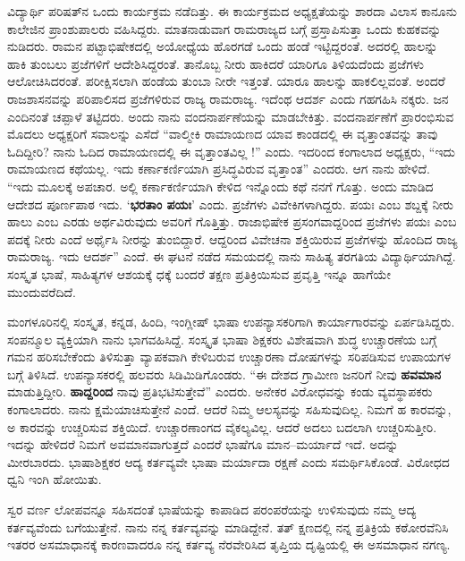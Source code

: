 ವಿದ್ಯಾರ್ಥಿ ಪರಿಷತ್‍ನ ಒಂದು ಕಾರ್ಯಕ್ರಮ ನಡೆದಿತ್ತು.  ಈ ಕಾರ್ಯಕ್ರಮದ ಅಧ್ಯಕ್ಷತೆಯನ್ನು ಶಾರದಾ ವಿಲಾಸ ಕಾನೂನು ಕಾಲೇಜಿನ ಪ್ರಾಂಶುಪಾಲರು ವಹಿಸಿದ್ದರು.  ಮಾತನಾಡುವಾಗ ರಾಮರಾಜ್ಯದ ಬಗ್ಗೆ ಪ್ರಸ್ತಾಪಿಸುತ್ತಾ ಒಂದು ಕುಹಕವನ್ನು ನುಡಿದರು.  ರಾಮನ ಪಟ್ಟಾಭಿಷೇಕದಲ್ಲಿ ಅಯೋಧ್ಯೆಯ ಹೊರಗಡೆ ಒಂದು ಹಂಡೆ ಇಟ್ಟಿದ್ದರಂತೆ.  ಅದರಲ್ಲಿ ಹಾಲನ್ನು ಹಾಕಿ ತುಂಬಲು ಪ್ರಜೆಗಳಿಗೆ ಆದೇಶಿಸಿದ್ದರಂತೆ.  ತಾನೊಬ್ಬ ನೀರು ಹಾಕಿದರೆ ಯಾರಿಗೂ ತಿಳಿಯದೆಂದು ಪ್ರಜೆಗಳು ಆಲೋಚಿಸಿದರಂತೆ. ಪರೀಕ್ಷಿಸಲಾಗಿ ಹಂಡೆಯ ತುಂಬಾ ನೀರೇ ಇತ್ತಂತೆ.  ಯಾರೂ ಹಾಲನ್ನು ಹಾಕಲಿಲ್ಲವಂತೆ.  ಅಂದರೆ ರಾಜಶಾಸನವನ್ನು ಪರಿಪಾಲಿಸದ ಪ್ರಜೆಗಳಿರುವ ರಾಜ್ಯ ರಾಮರಾಜ್ಯ.  ಇದೆಂಥ ಆದರ್ಶ ಎಂದು ಗಹಗಹಿಸಿ ನಕ್ಕರು.  ಜನ ಎಂದಿನಂತೆ ಚಪ್ಪಾಳೆ ತಟ್ಟಿದರು.  ಅಂದು ನಾನು ವಂದನಾರ್ಪಣೆಯನ್ನು ಮಾಡಬೇಕಿತ್ತು.  ವಂದನಾರ್ಪಣೆಗೆ ಪ್ರಾರಂಭಿಸುವ ಮೊದಲು ಅಧ್ಯಕ್ಷರಿಗೆ ಸವಾಲನ್ನು ಎಸೆದೆ  “ವಾಲ್ಮೀಕಿ ರಾಮಾಯಣದ ಯಾವ ಕಾಂಡದಲ್ಲಿ ಈ ವೃತ್ತಾಂತವನ್ನು ತಾವು ಓದಿದ್ದೀರಿ?  ನಾನು ಓದಿದ ರಾಮಾಯಣದಲ್ಲಿ ಈ ವೃತ್ತಾಂತವಿಲ್ಲ !” ಎಂದು.  ಇದರಿಂದ ಕಂಗಾಲಾದ ಅಧ್ಯಕ್ಷರು, “ಇದು ರಾಮಾಯಣದ ಕಥೆಯಲ್ಲ. ಇದು ಕರ್ಣಾಕರ್ಣಿಯಾಗಿ ಪ್ರಸಿದ್ಧವಿರುವ ವೃತ್ತಾಂತ” ಎಂದರು.  ಆಗ ನಾನು ಹೇಳಿದೆ.  “ಇದು ಮೂಲಕ್ಕೆ ಅಪಚಾರ.  ಅಲ್ಲಿ ಕರ್ಣಾಕರ್ಣಿಯಾಗಿ ಕೇಳಿದ ಇನ್ನೊಂದು ಕಥೆ ನನಗೆ ಗೊತ್ತು. ಅಂದು ಮಾಡಿದ ಆದೇಶದ ಪೂರ್ಣಪಾಠ ಇದು.  ‘\textbf{ಭರತಾಂ ಪಯಃ}’ ಎಂದು.  ಪ್ರಜೆಗಳು ವಿವೇಕಿಗಳಾಗಿದ್ದರು.  ಪಯಃ ಎಂಬ ಶಬ್ದಕ್ಕೆ ನೀರು ಹಾಲು ಎಂಬ ಎರಡು ಅರ್ಥವಿರುವುದು ಅವರಿಗೆ ಗೊತ್ತಿತ್ತು.  ರಾಜಾಭಿಷೇಕ ಪ್ರಸಂಗವಾದ್ದರಿಂದ ಪ್ರಜೆಗಳು ಪಯಃ ಎಂಬ ಪದಕ್ಕೆ ನೀರು ಎಂದೆ ಅರ್ಥೈಸಿ ನೀರನ್ನು ತುಂಬಿದ್ದಾರೆ. ಆದ್ದರಿಂದ ವಿವೇಚನಾ ಶಕ್ತಿಯಿರುವ ಪ್ರಜೆಗಳನ್ನು ಹೊಂದಿದ ರಾಜ್ಯ ರಾಮರಾಜ್ಯ.  ಇದು ಆದರ್ಶ” ಎಂದೆ.  ಈ ಘಟನೆ ನಡೆದ ಸಮಯದಲ್ಲಿ ನಾನು ಸಾಹಿತ್ಯ ತರಗತಿಯ ವಿದ್ಯಾರ್ಥಿಯಾಗಿದ್ದೆ.  ಸಂಸ್ಕೃತ ಭಾಷೆ, ಸಾಹಿತ್ಯಗಳ ಆಶಯಕ್ಕೆ ಧಕ್ಕೆ ಬಂದರೆ ತಕ್ಷಣ ಪ್ರತಿಕ್ರಿಯಿಸುವ ಪ್ರವೃತ್ತಿ ಇನ್ನೂ ಹಾಗೆಯೇ ಮುಂದುವರೆದಿದೆ.   

ಮಂಗಳೂರಿನಲ್ಲಿ ಸಂಸ್ಕೃತ, ಕನ್ನಡ, ಹಿಂದಿ, ಇಂಗ್ಲೀಷ್ ಭಾಷಾ ಉಪನ್ಯಾಸಕರಿಗಾಗಿ ಕಾರ್ಯಾಗಾರವನ್ನು ಏರ್ಪಡಿಸಿದ್ದರು.  ಸಂಪನ್ಮೂಲ ವ್ಯಕ್ತಿಯಾಗಿ ನಾನು ಭಾಗವಹಿಸಿದ್ದೆ.  ಸಂಸ್ಕೃತ ಭಾಷಾ ಶಿಕ್ಷಕರು ವಿಶೇಷವಾಗಿ ಶುದ್ಧ ಉಚ್ಚಾರಣೆಯ ಬಗ್ಗೆ ಗಮನ ಹರಿಸಬೇಕೆಂದು ತಿಳಿಸುತ್ತಾ ವ್ಯಾಪಕವಾಗಿ ಕೇಳಿಬರುವ ಉಚ್ಚಾರಣಾ ದೋಷಗಳನ್ನು ಸರಿಪಡಿಸುವ ಉಪಾಯಗಳ ಬಗ್ಗೆ ತಿಳಿಸಿದೆ.  ಉಪನ್ಯಾಸಕರಲ್ಲಿ ಹಲವರು ಸಿಡಿಮಿಡಿಗೊಂಡರು.  “ಈ ದೇಶದ ಗ್ರಾಮೀಣ ಜನರಿಗೆ ನೀವು \textbf{ಹವಮಾನ} ಮಾಡುತ್ತಿದ್ದೀರಿ.  \textbf{ಹಾದ್ದರಿಂದ} ನಾವು ಪ್ರತಿಭಟಿಸುತ್ತೇವೆ” ಎಂದರು.  ಅನೇಕರ ವಿರೋಧವನ್ನು ಕಂಡು ವ್ಯವಸ್ಥಾಪಕರು ಕಂಗಾಲಾದರು. ನಾನು ಕ್ಷಮೆಯಾಚಿಸುತ್ತೇನೆ  ಎಂದೆ.   ಆದರೆ ನಿಮ್ಮ ಆಲಸ್ಯವನ್ನು ಸಹಿಸುವುದಿಲ್ಲ.  ನಿಮಗೆ ಹ ಕಾರವನ್ನು, ಅ ಕಾರವನ್ನು ಉಚ್ಚರಿಸುವ ಶಕ್ತಿಯಿದೆ.  ಉಚ್ಚಾರಣಾಂಗದ ವೈಕಲ್ಯವಿಲ್ಲ.  ಆದರೆ ಅದಲು ಬದಲಾಗಿ ಉಚ್ಚರಿಸುತ್ತೀರಿ.  ಇದನ್ನು ಹೇಳಿದರೆ ನಿಮಗೆ ಅವಮಾನವಾಗುತ್ತದೆ ಎಂದರೆ ಭಾಷೆಗೂ ಮಾನ–ಮರ್ಯಾದೆ ಇದೆ.  ಅದನ್ನು ಮೀರಬಾರದು.  ಭಾಷಾಶಿಕ್ಷಕರ ಆದ್ಯ ಕರ್ತವ್ಯವೇ ಭಾಷಾ ಮರ್ಯಾದಾ ರಕ್ಷಣೆ ಎಂದು ಸಮರ್ಥಿಸಿಕೊಂಡೆ.  ವಿರೋಧದ ಧ್ವನಿ ಇಂಗಿ ಹೋಯಿತು. 

ಸ್ವರ ವರ್ಣ ಲೋಪವನ್ನೂ ಸಹಿಸದಂತೆ ಭಾಷೆಯನ್ನು ಕಾಪಾಡಿದ ಪರಂಪರೆಯನ್ನು ಉಳಿಸುವುದು ನಮ್ಮ ಆದ್ಯ ಕರ್ತವ್ಯವೆಂದು ಬಗೆಯುತ್ತೇನೆ.  ನಾನು ನನ್ನ ಕರ್ತವ್ಯವನ್ನು ಮಾಡಿದ್ದೇನೆ.  ತತ್ ಕ್ಷಣದಲ್ಲಿ ನನ್ನ ಪ್ರತಿಕ್ರಿಯೆ ಕಠೋರವೆನಿಸಿ ಇತರರ ಅಸಮಾಧಾನಕ್ಕೆ ಕಾರಣವಾದರೂ ನನ್ನ ಕರ್ತವ್ಯ ನೆರವೇರಿಸಿದ ತೃಪ್ತಿಯ ದೃಷ್ಟಿಯಲ್ಲಿ ಈ ಅಸಮಾಧಾನ ನಗಣ್ಯ.

